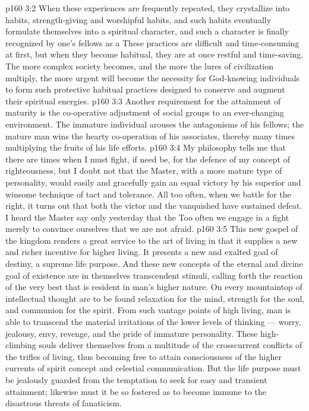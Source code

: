 \vs p160 3:2 When these experiences are frequently repeated, they crystallize into habits, strength\hyp{}giving and worshipful habits, and such habits eventually formulate themselves into a spiritual character, and such a character is finally recognized by one’s fellows as a  These practices are difficult and time\hyp{}consuming at first, but when they become habitual, they are at once restful and time\hyp{}saving. The more complex society becomes, and the more the lures of civilization multiply, the more urgent will become the necessity for God\hyp{}knowing individuals to form such protective habitual practices designed to conserve and augment their spiritual energies.
\vs p160 3:3 Another requirement for the attainment of maturity is the co\hyp{}operative adjustment of social groups to an ever\hyp{}changing environment. The immature individual arouses the antagonisms of his fellows; the mature man wins the hearty co\hyp{}operation of his associates, thereby many times multiplying the fruits of his life efforts.
\vs p160 3:4 My philosophy tells me that there are times when I must fight, if need be, for the defence of my concept of righteousness, but I doubt not that the Master, with a more mature type of personality, would easily and gracefully gain an equal victory by his superior and winsome technique of tact and tolerance. All too often, when we battle for the right, it turns out that both the victor and the vanquished have sustained defeat. I heard the Master say only yesterday that the  Too often we engage in a fight merely to convince ourselves that we are not afraid.
\vs p160 3:5 This new gospel of the kingdom renders a great service to the art of living in that it supplies a new and richer incentive for higher living. It presents a new and exalted goal of destiny, a supreme life purpose. And these new concepts of the eternal and divine goal of existence are in themselves transcendent stimuli, calling forth the reaction of the very best that is resident in man’s higher nature. On every mountaintop of intellectual thought are to be found relaxation for the mind, strength for the soul, and communion for the spirit. From such vantage points of high living, man is able to transcend the material irritations of the lower levels of thinking --- worry, jealousy, envy, revenge, and the pride of immature personality. These high\hyp{}climbing souls deliver themselves from a multitude of the crosscurrent conflicts of the trifles of living, thus becoming free to attain consciousness of the higher currents of spirit concept and celestial communication. But the life purpose must be jealously guarded from the temptation to seek for easy and transient attainment; likewise must it be so fostered as to become immune to the disastrous threats of fanaticism.
